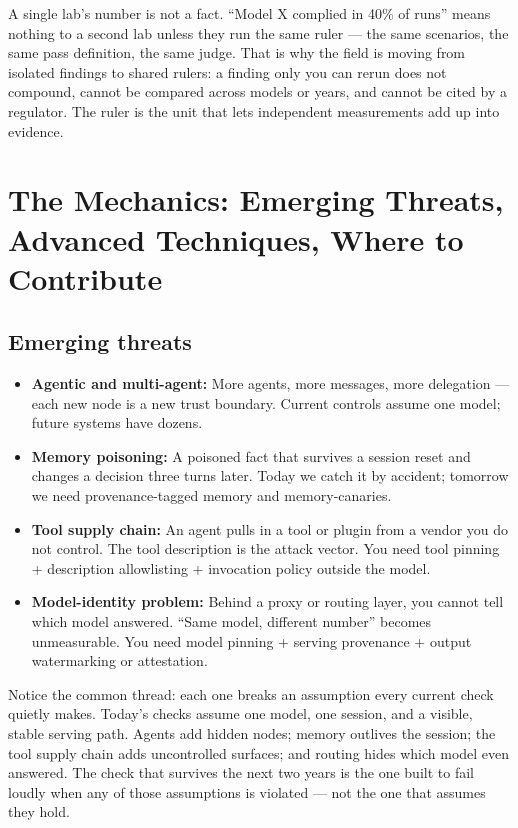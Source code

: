 A single lab's number is not a fact. ``Model X complied in 40\% of runs'' means nothing to a second lab unless they run the same ruler — the same scenarios, the same pass definition, the same judge. That is why the field is moving from isolated findings to shared rulers: a finding only you can rerun does not compound, cannot be compared across models or years, and cannot be cited by a regulator. The ruler is the unit that lets independent measurements add up into evidence.

\section{The Mechanics: Emerging Threats, Advanced Techniques, Where to Contribute}
\tierP

\subsection{Emerging threats}
\begin{itemize}
\item \textbf{Agentic and multi-agent:} More agents, more messages, more delegation — each new node is a new trust boundary. Current controls assume one model; future systems have dozens.
\item \textbf{Memory poisoning:} A poisoned fact that survives a session reset and changes a decision three turns later. Today we catch it by accident; tomorrow we need provenance-tagged memory and memory-canaries.
\item \textbf{Tool supply chain:} An agent pulls in a tool or plugin from a vendor you do not control. The tool description is the attack vector. You need tool pinning + description allowlisting + invocation policy outside the model.
\item \textbf{Model-identity problem:} Behind a proxy or routing layer, you cannot tell which model answered. ``Same model, different number'' becomes unmeasurable. You need model pinning + serving provenance + output watermarking or attestation.
\end{itemize}

Notice the common thread: each one breaks an assumption every current check quietly makes. Today's checks assume one model, one session, and a visible, stable serving path. Agents add hidden nodes; memory outlives the session; the tool supply chain adds uncontrolled surfaces; and routing hides which model even answered. The check that survives the next two years is the one built to fail loudly when any of those assumptions is violated — not the one that assumes they hold.

